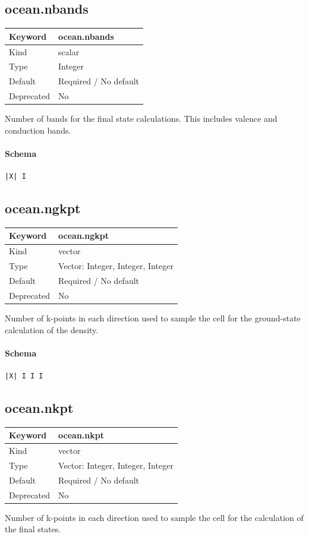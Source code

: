 \documentclass[11pt]{article}
\begin{document}
{{{{{\subsection{ocean.nbands}
\label{kw:ocean-nbands}
\begin{longtable}{|p{1.5in}|p{4.5in}|}
\hline
Keyword & ocean.nbands \\
\hline
Kind & scalar \\
\hline
Type & Integer \\
\hline
Default & Required / No default \\
\hline
Deprecated & No \\
\hline
\end{longtable}
 Number of bands for the final state calculations. This includes valence and conduction bands.

\paragraph{Schema}
\begin{Verbatim}
|X| I
\end{Verbatim}

\subsection{ocean.ngkpt}
\label{kw:ocean-ngkpt}
\begin{longtable}{|p{1.5in}|p{4.5in}|}
\hline
Keyword & ocean.ngkpt \\
\hline
Kind & vector \\
\hline
Type & Vector: Integer, Integer, Integer \\
\hline
Default & Required / No default \\
\hline
Deprecated & No \\
\hline
\end{longtable}
 Number of k-points in each direction used to sample the cell for
 the ground-state calculation of the density.

\paragraph{Schema}
\begin{Verbatim}
|X| I I I
\end{Verbatim}

\subsection{ocean.nkpt}
\label{kw:ocean-nkpt}
\begin{longtable}{|p{1.5in}|p{4.5in}|}
\hline
Keyword & ocean.nkpt \\
\hline
Kind & vector \\
\hline
Type & Vector: Integer, Integer, Integer \\
\hline
Default & Required / No default \\
\hline
Deprecated & No \\
\hline
\end{longtable}
 Number of k-points in each direction used to sample the
 cell for the calculation of the
 final states.

}}}}}
\end{document}
